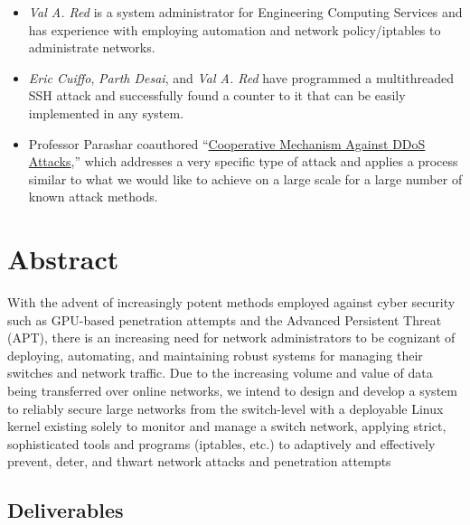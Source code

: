 \begin{itemize}
	\item \emph{Val A. Red} is a system administrator for Engineering Computing Services 
	and has experience with employing automation and network policy/iptables to administrate networks.
	\item \emph{Eric Cuiffo}, \emph{Parth Desai}, and \emph{Val A. Red} have programmed
	 a multithreaded SSH attack and successfully found a counter to it that can be easily implemented in any system.
	\item Professor Parashar coauthored 
	``\href{http://nsfcac.rutgers.edu/TASSL/Papers/ddos-icics-04.pdf}{Cooperative Mechanism Against DDoS Attacks},''
	 which addresses a very specific type of attack and applies a process similar to what we would like to achieve 
	 on a large scale for a large number of known attack methods.
\end{itemize}

\section{Abstract}

With the advent of increasingly potent methods employed against cyber security such as
GPU-based penetration attempts and the Advanced Persistent Threat (APT), there is an increasing
need for network administrators to be cognizant of deploying, automating, and maintaining robust
systems for managing their switches and network traffic. Due to the increasing volume and value of
data being transferred over online networks, we intend to design and develop a system to reliably
secure large networks from the switch-level with a deployable Linux kernel existing solely to monitor
and manage a switch network, applying strict, sophisticated tools and programs (iptables, etc.) to
adaptively and effectively prevent, deter, and thwart network attacks and penetration attempts

\subsection{Deliverables}

